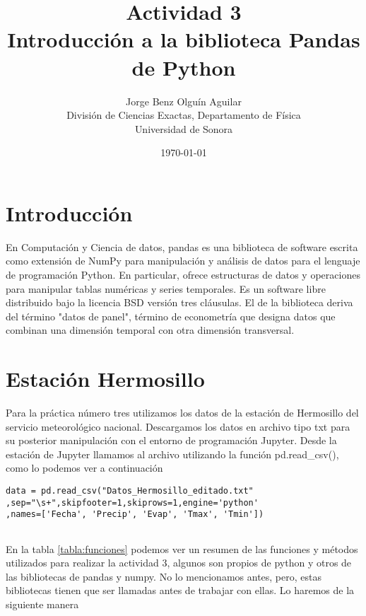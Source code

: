 \documentclass[12pt,a4paper]{article}
\begin{document}
\title{Actividad 3\\ Introducción a la biblioteca Pandas de Python  }
\author{
 Jorge Benz Olguín Aguilar\\
\small{División de Ciencias Exactas, Departamento de Física}\\
\small{Universidad de Sonora}\\
}
\date{\small{\today}}
\maketitle

\section{Introducción}

\noindent En Computación y Ciencia de datos, pandas es una biblioteca de software escrita como extensión de NumPy para manipulación y análisis de datos para el lenguaje de programación Python. En particular, ofrece estructuras de datos y operaciones para manipular tablas numéricas y series temporales. Es un software libre distribuido bajo la licencia BSD versión tres cláusulas. El de la biblioteca deriva del término "datos de panel", término de econometría que designa datos que combinan una dimensión temporal con otra dimensión transversal.\cite{1}

\section{Estación Hermosillo}

\noindent Para la práctica número tres utilizamos los datos de la estación de Hermosillo del servicio meteorológico nacional. Descargamos los datos en archivo tipo txt para su posterior manipulación con el entorno de programación Jupyter. Desde la estación de Jupyter llamamos al archivo utilizando la función pd.read\_csv(), como lo podemos ver a continuación

\begin{verbatim}
data = pd.read_csv("Datos_Hermosillo_editado.txt"
,sep="\s+",skipfooter=1,skiprows=1,engine='python'
,names=['Fecha', 'Precip', 'Evap', 'Tmax', 'Tmin'])
    
\end{verbatim}

\noindent En la tabla \ref{tabla:funciones} podemos ver un resumen de las funciones y métodos utilizados para realizar la actividad 3, algunos son propios de python y otros de las bibliotecas de pandas y numpy. No lo mencionamos antes, pero, estas bibliotecas tienen que ser llamadas antes de trabajar con ellas. Lo haremos de la siguiente manera
\end{document}
